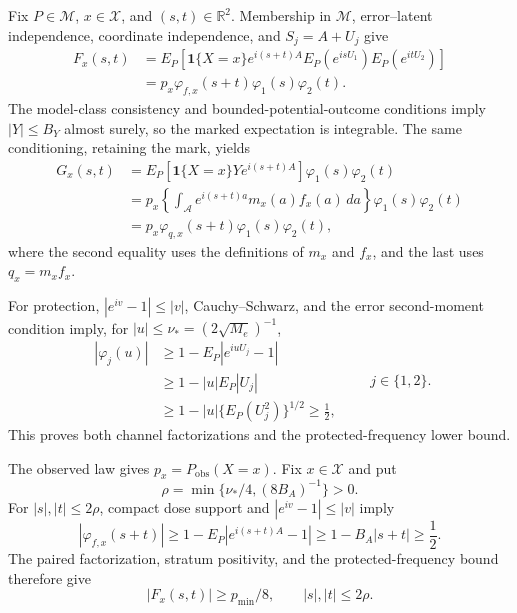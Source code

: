 Fix \(P\in\mathcal M\), \(x\in\mathcal X\), and \((s,t)\in\mathbb R^2\).  Membership in \(\mathcal M\), error--latent independence, coordinate independence, and \(S_j=A+U_j\) give
\[
\begin{aligned}
F_x(s,t)
&=E_P\!\left[\mathbf 1\{X=x\}e^{i(s+t)A}
 E_P(e^{isU_1})E_P(e^{itU_2})\right]\\
&=p_x\varphi_{f,x}(s+t)\varphi_1(s)\varphi_2(t).
\end{aligned}
\]
The model-class consistency and bounded-potential-outcome conditions imply \(|Y|\le B_Y\) almost surely, so the marked expectation is integrable.  The same conditioning, retaining the mark, yields
\[
\begin{aligned}
G_x(s,t)
&=E_P\!\left[\mathbf 1\{X=x\}Y e^{i(s+t)A}\right]
  \varphi_1(s)\varphi_2(t)\\
&=p_x\left\{\int_{\mathcal A}e^{i(s+t)a}m_x(a)f_x(a)\,da\right\}
  \varphi_1(s)\varphi_2(t)\\
&=p_x\varphi_{q,x}(s+t)\varphi_1(s)\varphi_2(t),
\end{aligned}
\]
where the second equality uses the definitions of \(m_x\) and \(f_x\), and the last uses \(q_x=m_xf_x\).

For protection, \(|e^{iv}-1|\le |v|\), Cauchy--Schwarz, and the error second-moment condition imply, for \(|u|\le\nu_*=(2\sqrt{M_e})^{-1}\),
\[
\begin{aligned}
|\varphi_j(u)|
&\ge 1-E_P|e^{iuU_j}-1|\\
&\ge 1-|u|E_P|U_j|\\
&\ge 1-|u|\{E_P(U_j^2)\}^{1/2}
\ge \frac12,
\end{aligned}
\qquad j\in\{1,2\}.
\]
This proves both channel factorizations and the protected-frequency lower bound.

The observed law gives \(p_x=P_{\mathrm{obs}}(X=x)\).  Fix \(x\in\mathcal X\) and put
\[
\rho=\min\{\nu_*/4,(8B_A)^{-1}\}>0.
\]
For \(|s|,|t|\le2\rho\), compact dose support and \(|e^{iv}-1|\le |v|\) imply
\[
|\varphi_{f,x}(s+t)|
\ge 1-E_P|e^{i(s+t)A}-1|
\ge 1-B_A|s+t|\ge\frac12.
\]
The paired factorization, stratum positivity, and the protected-frequency bound therefore give
\[
|F_x(s,t)|\ge p_{\min}/8,
\qquad |s|,|t|\le2\rho. \tag{1}
\]

